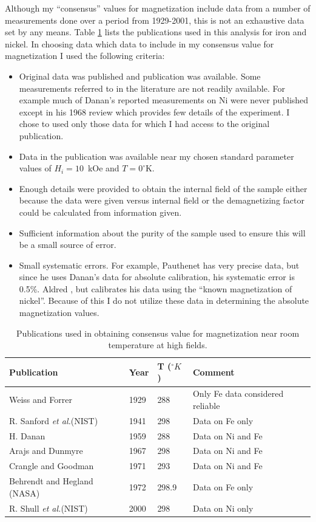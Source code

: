 \documentclass[12pt]{article}
\begin{document}
Although my ``consensus'' values for magnetization include data from a number of measurements done over a period from 1929-2001, this is not an exhaustive data set by any means. Table \ref{tab:magnetization_pubs} lists the publications used in this analysis for iron and nickel. In choosing data which data to include in my consensus value for magnetization I used the following criteria:
\begin{itemize}
\item{Original data was published and publication was available. Some measurements referred to in the literature are not readily available. For example much of Danan's reported measurements on Ni were never published except in his 1968 review which provides few details of the experiment. I chose to used only those data for which I had access to the original publication.}
\item{Data in the publication was available near my chosen standard parameter values of $H_i=10$~kOe and $T=0^{\circ}$K.}
\item{Enough details were provided to obtain the internal field of the sample either because the data were given versus internal field or the demagnetizing factor could be calculated from information given.}
\item{Sufficient information about the purity of the sample used to ensure this will be a small source of error.}
\item{Small systematic errors. For example, Pauthenet \cite{PauthenetMar1982} has very precise data, but since he uses Danan's data for absolute calibration, his systematic error is 0.5\%. Aldred \cite{Aldred1975}, but calibrates his data using the ``known magnetization of nickel''. Because of this I do not utilize these data in determining the absolute magnetization values.} 
\end{itemize}
\begin{table}[h]
\begin{center}
\begin{tabular}{|l|l|l|l|}\hline
Publication & Year & T ($^{\circ}K$) & Comment\\\hline
Weiss and Forrer \cite{Weiss1929} & 1929 & 288 & Only Fe data considered reliable\\
R. Sanford {\it et al.}(NIST)\cite{Sanford1941} & 1941 & 298 & Data on Fe only\\
H. Danan \cite{Danan1959} & 1959 & 288 & Data on Ni and Fe\\
Arajs and Dunmyre \cite{Arajs1967}& 1967 & 298 & Data on Ni and Fe\\
Crangle and Goodman \cite{Crangle1971} & 1971 & 293 & Data on Ni and Fe\\
Behrendt and Hegland (NASA)\cite{Behrendt1972} & 1972 & 298.9 & Data on Fe only\\
R. Shull {\it et al.}(NIST) & 2000 & 298 & Data on Ni only\\\hline
\end{tabular}
\end{center}
\caption{\label{tab:magnetization_pubs}Publications used in obtaining consensus value for magnetization near room temperature at high fields.}
\end{table}
\end{document}
